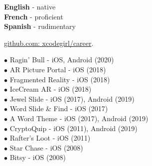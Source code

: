 \documentclass[9pt]{developercv} %
\begin{document}
\begin{minipage}[t]{0.5\textwidth}
	\vspace{-\baselineskip} %

	
	\textbf{English} - native\\
	\textbf{French} - proficient\\
	\textbf{Spanish} - rudimentary


 {\href{https://github.com/xcodegirl/career/blob/main/xcodegirl-work-samples.md}{github.com: xcodegirl/career}}.

\end{minipage}
\hfill
\begin{minipage}[t]{0.5\textwidth}
	\vspace{-\baselineskip} %
	

$\bullet$ Ragin’ Bull - iOS, Android (2020)
\\ $\bullet$ AR Picture Portal - iOS (2018)
\\ $\bullet$ Fragmented Reality - iOS (2018)
\\ $\bullet$ IceCream AR - iOS (2018)
\\ $\bullet$ Jewel Slide - iOS (2017), Android (2019)
\\ $\bullet$ Word Slide \& Find - iOS (2017)
\\ $\bullet$ A Word Theme - iOS (2017), Android (2019)
\\ $\bullet$ CryptoQuip - iOS (2011), Android (2019)
\\ $\bullet$ Rafter’s Loot - iOS (2011)
\\ $\bullet$ Star Chase - iOS (2008)
\\ $\bullet$ Bitsy - iOS (2008)

\end{minipage}

\end{document}
